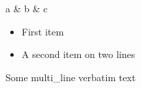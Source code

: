 \documentclass{article}
\begin{document}
\begin{tabular}[lcc]
  a & b & c
  \hline
\end{tabular}

\begin{itemize}
  \item First item
  \item A second item on two 
  lines
\end{itemize}

\begin{verbatim*}
  Some multi_line
  verbatim text
\end{verbatim*}
\end{document}
